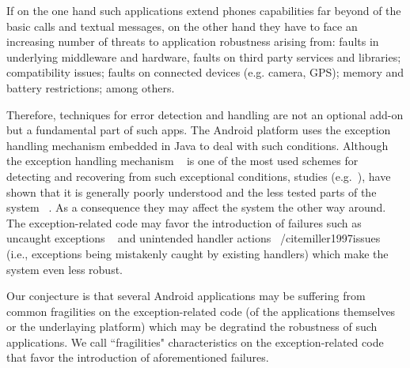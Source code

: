\documentclass[conference]{IEEEtran}
\begin{document}

If on the one hand such applications extend phones capabilities 
far beyond of the basic calls and textual messages, on the other hand
they have to face an increasing number of threats to application robustness
 arising from: faults in underlying middleware and hardware, 
faults on third party services and libraries; compatibility issues; 
faults on connected devices (e.g. camera, GPS); memory and 
battery restrictions; among others.


Therefore, techniques for error detection and handling are not  an optional add-on but a 
fundamental part of such apps.
The Android platform uses the exception handling mechanism embedded
 in Java to deal with such conditions. Although the exception handling mechanism
~\cite{goodenough1975exception} is one of the most used schemes for
detecting and recovering from such exceptional conditions, studies (e.g.~\cite{miller1997issues,Robil00,shah2010understanding, garcia2007extracting,garcia2001comparative,cabral2007exception,coelho2011unveiling}),
have shown that it is generally poorly understood and the less tested parts of the system ~\cite{coelho2011unveiling}.
As a consequence they may affect the system the other way around.
The exception-related code may favor the introduction of failures such as uncaught exceptions ~\cite{jo2004uncaught, zhang2012amplifying}
and unintended handler actions ~/cite{miller1997issues} (i.e., exceptions being mistakenly caught by existing handlers) 
which make the system even less robust.



Our conjecture is that several Android applications may be suffering from common 
fragilities on the exception-related code (of the applications themselves or 
the underlaying platform) which may be degratind the robustness of such applications.
We call ``fragilities" characteristics on the exception-related code that favor the introduction
of aforementioned failures.
\end{document}
